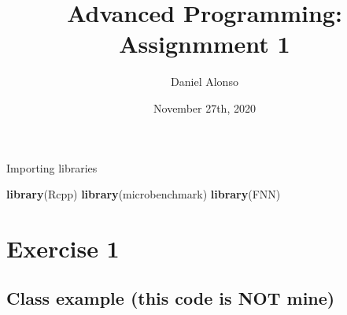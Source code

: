 \documentclass[]{article}
\title{Advanced Programming: Assignmment 1}
\author{Daniel Alonso}
\date{November 27th, 2020}
\newenvironment{Shaded}{\begin{snugshade}}{\end{snugshade}}
\newcommand{\KeywordTok}[1]{\textcolor[rgb]{0.13,0.29,0.53}{\textbf{#1}}}
\newcommand{\NormalTok}[1]{#1}
\begin{document}
\maketitle

Importing libraries

\begin{Shaded}
\begin{Highlighting}[]
\KeywordTok{library}\NormalTok{(Rcpp)}
\KeywordTok{library}\NormalTok{(microbenchmark)}
\KeywordTok{library}\NormalTok{(FNN)}
\end{Highlighting}
\end{Shaded}

\hypertarget{exercise-1}{%
\section{Exercise 1}\label{exercise-1}}

\hypertarget{class-example-this-code-is-not-mine}{%
\subsection{Class example (this code is NOT
mine)}\label{class-example-this-code-is-not-mine}}
\end{document}
